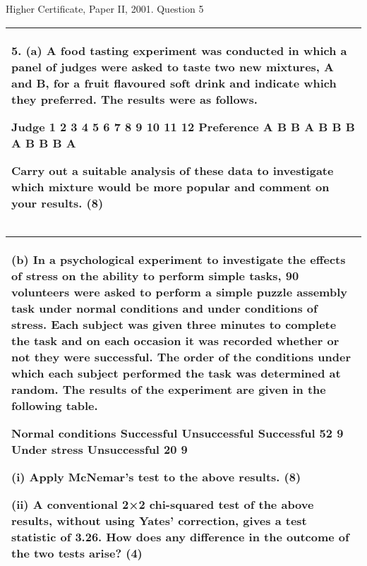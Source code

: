 \documentclass[a4paper,12pt]{article}
\begin{document}


Higher Certificate, Paper II, 2001. Question 5
\begin{table}[ht!]
 
\centering
 
\begin{tabular}{|p{15cm}|}
 
\hline  

5. (a) A food tasting experiment was conducted in which a panel of judges were asked to taste two new mixtures, A and B, for a fruit flavoured soft drink and indicate which they preferred.  The results were as follows. 
 
Judge 1 2 3 4 5 6 7 8 9 10 11 12 Preference A B B A B B B A B B B A 
 
Carry out a suitable analysis of these data to investigate which mixture would be more popular and comment on your results. (8)
\\ \hline
  
\end{tabular}

\end{table} 


\begin{table}[ht!]
 
\centering
 
\begin{tabular}{|p{15cm}|}
 
\hline  

 (b) In a psychological experiment to investigate the effects of stress on the ability to perform simple tasks, 90 volunteers were asked to perform a simple puzzle assembly task under normal conditions and under conditions of stress.  Each subject was given three minutes to complete the task and on each occasion it was recorded whether or not they were successful.  The order of the conditions under which each subject performed the task was determined at random.  The results of the experiment are given in the following table. 
 
Normal conditions  Successful Unsuccessful Successful 52 9 Under stress Unsuccessful 20 9 
 
  (i) Apply McNemar's test to the above results. 
(8) 
 
  (ii) A conventional 2×2 chi-squared test of the above results, without using Yates' correction, gives a test statistic of 3.26.  How does any difference in the outcome of the two tests arise? (4) 


\\ \hline
  
\end{tabular}

\end{table} 
\end{document}
